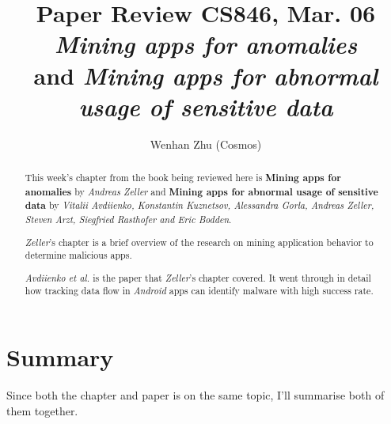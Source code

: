 \documentclass[sigconf]{acmart}
\begin{document}
\title{Paper Review CS846, Mar. 06\\
{\it Mining apps for anomalies} \\
and {\it Mining apps for abnormal usage of sensitive data}
}

\author{Wenhan Zhu (Cosmos)}

\begin{abstract}

    This week's chapter from the book being reviewed here is {\bf Mining apps for anomalies} by {\it Andreas Zeller} and {\bf Mining apps for abnormal usage of sensitive data} by {\it Vitalii Avdiienko, Konstantin Kuznetsov, Alessandra Gorla, Andreas Zeller, Steven Arzt, Siegfried Rasthofer and Eric Bodden}.

    {\it Zeller}'s chapter is a brief overview of the research on mining application behavior to determine malicious apps. 

    {\it Avdiienko et al.} is the paper that {\it Zeller}'s chapter covered. It went through in detail how tracking data flow in {\it Android} apps can identify malware with high success rate.

\end{abstract}


\maketitle

\section{Summary}

Since both the chapter and paper is on the same topic, I'll summarise both of them together. 
\end{document}
